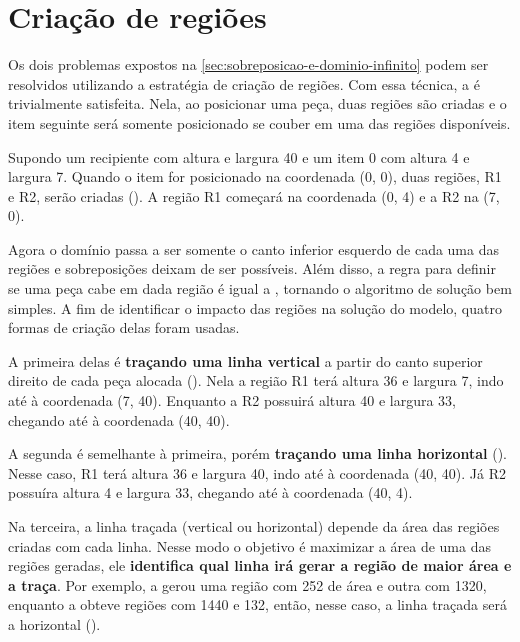\section{Criação de regiões}\label{sec:criacao-de-regioes}

Os dois problemas expostos na \cref{sec:sobreposicao-e-dominio-infinito} podem ser
resolvidos utilizando a estratégia de criação de regiões.
Com essa técnica, a  é trivialmente satisfeita.
Nela, ao posicionar uma peça, duas regiões são criadas e o item
seguinte será somente posicionado se couber em uma das regiões disponíveis.

Supondo um recipiente com altura e largura 40 e um item 0 com altura 4 e largura 7.
Quando o item for posicionado na coordenada (0, 0), duas regiões, R1 e R2, serão criadas
().
A região R1 começará na coordenada (0, 4) e a R2 na (7, 0).



Agora o domínio passa a ser somente o canto inferior esquerdo de cada uma das regiões e
sobreposições deixam de ser possíveis.
Além disso, a regra para definir se uma peça cabe em dada região é igual a , tornando
o algoritmo de solução bem simples.
A fim de identificar o impacto das regiões na solução do modelo, quatro formas de criação
delas foram usadas.

A primeira delas é \textbf{traçando uma linha vertical} a partir do canto superior direito de cada
peça alocada ().
Nela a região R1 terá altura 36 e largura 7, indo até à coordenada (7, 40).
Enquanto a R2 possuirá altura 40 e largura 33, chegando até à coordenada (40, 40).

A segunda é semelhante à primeira, porém \textbf{traçando uma linha horizontal}
().
Nesse caso, R1 terá altura 36 e largura 40, indo até à coordenada (40, 40).
Já R2 possuíra altura 4 e largura 33, chegando até à coordenada (40, 4).



Na terceira, a linha traçada (vertical ou horizontal) depende da área das regiões criadas
com cada linha.
Nesse modo o objetivo é maximizar a área de uma das regiões geradas, ele \textbf{identifica qual
linha irá gerar a região de maior área e a traça}.
Por exemplo, a  gerou uma região com 252 de área e outra com 1320,
enquanto a  obteve regiões com 1440 e 132, então, nesse caso, a linha
traçada será a horizontal ().

